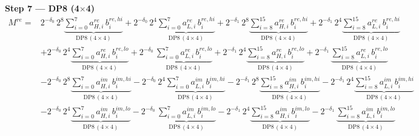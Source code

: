 \documentclass[fleqn]{article}
\newcommand{\DPop}[3]{\mathrm{DP#1}\,(#2\!\times\!#3)}
\begin{document}
\textbf{Step 7 --- DP8 (4$\times$4)}
\begin{align*}
M^{re} = {}
  & 2^{-\delta_0}\,2^{8}\underbrace{\sum_{i=0}^{7} a_{H,i}^{re}\, b_i^{re,hi}}_{\DPop{8}{4}{4}}
  + 2^{-\delta_0}\,2^{4}\underbrace{\sum_{i=0}^{7} a_{L,i}^{re}\, b_i^{re,hi}}_{\DPop{8}{4}{4}}
  + 2^{-\delta_1}\,2^{8}\underbrace{\sum_{i=8}^{15} a_{H,i}^{re}\, b_i^{re,hi}}_{\DPop{8}{4}{4}}
  + 2^{-\delta_1}\,2^{4}\underbrace{\sum_{i=8}^{15} a_{L,i}^{re}\, b_i^{re,hi}}_{\DPop{8}{4}{4}} \\[0.6em]
  & + 2^{-\delta_0}\,2^{4}\underbrace{\sum_{i=0}^{7} a_{H,i}^{re}\, b_i^{re,lo}}_{\DPop{8}{4}{4}}
  + 2^{-\delta_0}\,\underbrace{\sum_{i=0}^{7} a_{L,i}^{re}\, b_i^{re,lo}}_{\DPop{8}{4}{4}}
  + 2^{-\delta_1}\,2^{4}\underbrace{\sum_{i=8}^{15} a_{H,i}^{re}\, b_i^{re,lo}}_{\DPop{8}{4}{4}}
  + 2^{-\delta_1}\,\underbrace{\sum_{i=8}^{15} a_{L,i}^{re}\, b_i^{re,lo}}_{\DPop{8}{4}{4}} \\[0.6em]
  & - 2^{-\delta_0}\,2^{8}\underbrace{\sum_{i=0}^{7} a_{H,i}^{im}\, b_i^{im,hi}}_{\DPop{8}{4}{4}}
  - 2^{-\delta_0}\,2^{4}\underbrace{\sum_{i=0}^{7} a_{L,i}^{im}\, b_i^{im,hi}}_{\DPop{8}{4}{4}}
  - 2^{-\delta_1}\,2^{8}\underbrace{\sum_{i=8}^{15} a_{H,i}^{im}\, b_i^{im,hi}}_{\DPop{8}{4}{4}}
  - 2^{-\delta_1}\,2^{4}\underbrace{\sum_{i=8}^{15} a_{L,i}^{im}\, b_i^{im,hi}}_{\DPop{8}{4}{4}} \\[0.6em]
  & - 2^{-\delta_0}\,2^{4}\underbrace{\sum_{i=0}^{7} a_{H,i}^{im}\, b_i^{im,lo}}_{\DPop{8}{4}{4}}
  - 2^{-\delta_0}\,\underbrace{\sum_{i=0}^{7} a_{L,i}^{im}\, b_i^{im,lo}}_{\DPop{8}{4}{4}}
  - 2^{-\delta_1}\,2^{4}\underbrace{\sum_{i=8}^{15} a_{H,i}^{im}\, b_i^{im,lo}}_{\DPop{8}{4}{4}}
  - 2^{-\delta_1}\,\underbrace{\sum_{i=8}^{15} a_{L,i}^{im}\, b_i^{im,lo}}_{\DPop{8}{4}{4}}
\end{align*}
\end{document}
